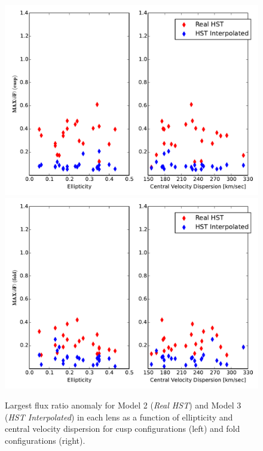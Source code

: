 \begin{figure}
	{\includegraphics[trim=0cm 0cm 0cm
		0cm,clip,width=.48\textwidth]{./figures_sls/EllipVdis_vs_fluxratio_maxanomaly_cusprebinsmooth-eps-converted-to.pdf}}
	{\includegraphics[trim=0cm 0cm 0cm
		0cm,clip,width=.48\textwidth]{./figures_sls/EllipVdis_vs_fluxratio_maxanomaly_foldrebinsmooth-eps-converted-to.pdf}}
	\caption[The largest flux ratio anomaly for \textit{Real HST} and \textit{HST Interpolated} models as a function of ellipticity and central velocity dispersion]{\label{fig:fluxratios_23}Largest flux ratio anomaly for Model 2 (\textit{Real HST}) and Model 3 (\textit{HST Interpolated}) in each lens as a function of ellipticity and central velocity dispersion for cusp configurations (left) and fold configurations (right).}
\end{figure}
